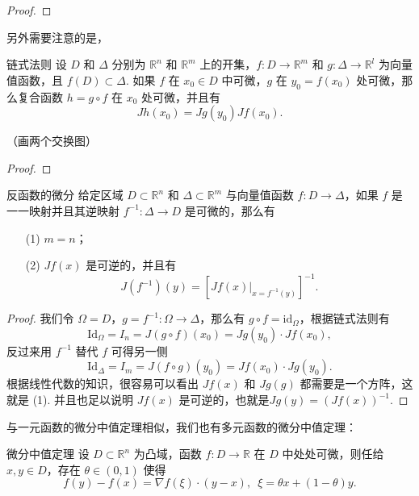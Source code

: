 \begin{proof}

\end{proof}

另外需要注意的是，

\begin{theorem}{链式法则}{}
    设 $D$ 和 $\Delta$ 分别为 $\mathbb{R}^n$ 和 $\mathbb{R}^m$ 上的开集，$f: D\to \mathbb{R}^m$ 和 $g: \Delta\to \mathbb{R}^l$ 为向量值函数，且 $f(D)\subset \Delta$. 如果 $f$ 在 $x_0\in D$ 中可微，$g$ 在 $y_0 = f(x_0)$ 处可微，那么复合函数 $h = g\circ f$ 在 $x_0$ 处可微，并且有\[Jh(x_0) = Jg(y_0)Jf(x_0).\]

    （画两个交换图）
\end{theorem}

\begin{proof}

\end{proof}

\begin{corollary}{反函数的微分}{}
    给定区域 $D\subset \mathbb{R}^n$ 和 $\Delta \subset \mathbb{R}^m$ 与向量值函数 $f: D\to \Delta$，如果 $f$ 是一一映射并且其逆映射 $f^{-1}: \Delta\to D$ 是可微的，那么有
    \begin{enumerate}
        \item[(1)] $m = n$；
        \item[(2)] $Jf(x)$ 是可逆的，并且有 \[J(f^{-1})(y) = [\left.Jf(x)\right|_{x = f^{-1}(y)}]^{-1}.\]
    \end{enumerate}
\end{corollary}

\begin{proof}
    我们令 $\Omega = D$，$g = f^{-1}: \Omega\to\Delta$，那么有 $g \circ f = \mathrm{id}_{\Omega}$，根据链式法则有 \[\mathrm{Id}_{\Omega} = I_{n} = J(g\circ f)(x_0) = Jg(y_0)\cdot Jf(x_0),\]
    反过来用 $f^{-1}$ 替代 $f$ 可得另一侧\[\mathrm{Id}_{\Delta} = I_m = J(f\circ g)(y_0) = Jf(x_0)\cdot Jg(y_0).\]
    根据线性代数的知识，很容易可以看出 $Jf(x)$ 和 $Jg(g)$ 都需要是一个方阵，这就是 (1). 并且也足以说明 $Jf(x)$ 是可逆的，也就是$Jg(y) = (Jf(x))^{-1}.$
\end{proof}

与一元函数的微分中值定理相似，我们也有多元函数的微分中值定理：

\begin{theorem}{微分中值定理}{}
    设 $D\subset \mathbb{R}^n$ 为凸域，函数 $f:D\to \mathbb{R}$ 在 $D$ 中处处可微，则任给 $x,y\in D$，存在 $\theta\in (0, 1)$ 使得\[f(y) - f(x) = \nabla f(\xi)\cdot(y-x),\enspace \xi=\theta x + (1-\theta)y.\]
\end{theorem}

